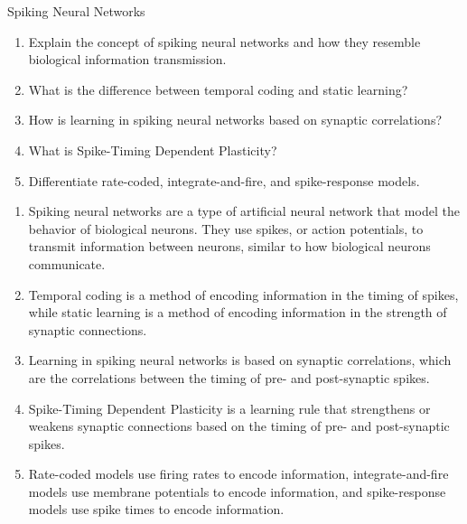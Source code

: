 \documentclass{article}
\author{Leopold Lemmermann}
\begin{document}
\createtitle


\begin{exercise}{Spiking Neural Networks}
  \begin{enumerate}
    \item Explain the concept of spiking neural networks and how they resemble biological information transmission.
    \item What is the difference between temporal coding and static learning?
    \item How is learning in spiking neural networks based on synaptic correlations?
    \item What is Spike-Timing Dependent Plasticity?
    \item Differentiate rate-coded, integrate-and-fire, and spike-response models.
  \end{enumerate}

  \begin{solution}
    \begin{enumerate}
      \item Spiking neural networks are a type of artificial neural network that model the behavior of biological neurons. They use spikes, or action potentials, to transmit information between neurons, similar to how biological neurons communicate.
      \item Temporal coding is a method of encoding information in the timing of spikes, while static learning is a method of encoding information in the strength of synaptic connections.
      \item Learning in spiking neural networks is based on synaptic correlations, which are the correlations between the timing of pre- and post-synaptic spikes.
      \item Spike-Timing Dependent Plasticity is a learning rule that strengthens or weakens synaptic connections based on the timing of pre- and post-synaptic spikes.
      \item Rate-coded models use firing rates to encode information, integrate-and-fire models use membrane potentials to encode information, and spike-response models use spike times to encode information.
    \end{enumerate}
  \end{solution}
\end{exercise}





\end{document}
